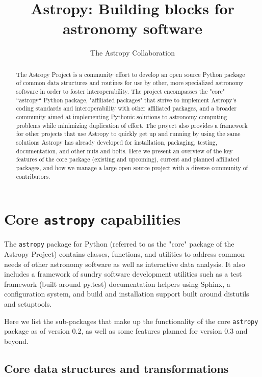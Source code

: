 \documentclass[11pt,twoside]{article}
\begin{document}
\title{Astropy: Building blocks for astronomy software}

\author{The Astropy Collaboration}

\begin{abstract}
The Astropy Project is a community effort to develop an open source Python
package of common data structures and routines for use by other, more
specialized astronomy software in order to foster interoperability.
The project encompasses the "core" ``astropy`` Python package, "affiliated
packages" that strive to implement Astropy's coding standards and
interoperability with other affiliated packages, and a broader community aimed
at implementing Pythonic solutions to astronomy computing problems while
minimizing duplication of effort.  The project also provides a framework for
other projects that use Astropy to quickly get up and running by using the same
solutions Astropy has already developed for installation, packaging, testing,
documentation, and other nuts and bolts.
Here we present an overview of the key features of the core package (existing
and upcoming), current and planned affiliated packages, and how we manage a
large open source project with a diverse community of contributors.
\end{abstract}

\section{Core \texttt{astropy} capabilities}

The \texttt{astropy} package for Python (referred to as the "core" package of
the Astropy Project) contains classes, functions, and utilities to address
common needs of other astronomy software as well as interactive data analysis.
It also includes a framework of sundry software development utilities such as a
test framework (built around py.test) documentation helpers using Sphinx, a
configuration system, and build and installation support built around distutils
and setuptools.

Here we list the sub-packages that make up the functionality of the core
\texttt{astropy} package as of version 0.2, as well as some features planned
for version 0.3 and beyond.

\subsection{Core data structures and transformations}

\end{document}
